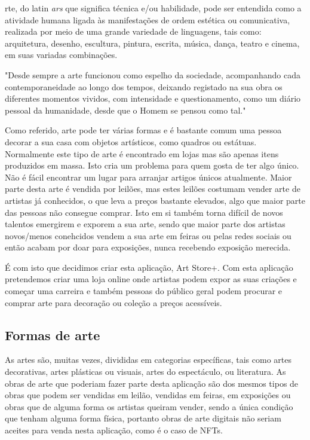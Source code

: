 \documentclass[conference]{IEEEtran}
\begin{document}
rte, do latin \textit{ars} que significa técnica e/ou 
habilidade, pode ser entendida como a atividade humana ligada às 
manifestações de ordem estética ou comunicativa, realizada 
por meio de uma grande variedade de linguagens, tais como: 
arquitetura, desenho, escultura, 
pintura, escrita, música, dança, teatro e cinema, em suas 
variadas combinações. \cite{wikiarte}

"Desde sempre a arte funcionou como espelho da sociedade, 
acompanhando cada contemporaneidade ao longo dos tempos, 
deixando registado na sua obra os diferentes 
momentos vividos, com intensidade e questionamento, como 
um diário pessoal da humanidade, 
desde que o Homem se pensou como tal." \cite{patrimonio}

Como referido, arte pode ter várias formas e é bastante comum 
uma pessoa decorar a sua casa com objetos artísticos, como 
quadros ou estátuas. Normalmente este tipo de arte é encontrado 
em lojas mas são apenas itens produzidos em massa. Isto cria um 
problema para quem gosta de ter algo único. Não é fácil encontrar 
um lugar para arranjar artigos únicos atualmente. Maior parte 
desta arte é vendida por leilões, mas estes leilões costumam 
vender arte de artistas já conhecidos, o que leva a preços 
bastante elevados, algo que maior parte das pessoas não consegue 
comprar. Isto em si também torna difícil de novos talentos emergirem 
e exporem a sua arte, sendo que maior parte dos artistas novos/menos 
conehcidos vendem a sua arte em feiras ou pelas redes sociais ou 
então acabam por doar para exposições, nunca recebendo exposição 
merecida.

É com isto que decidimos criar esta aplicação, Art Store+. Com 
esta aplicação pretendemos criar uma loja online onde artistas 
podem expor as suas criações e começar uma carreira e também 
pessoas do público geral podem procurar e comprar arte para 
decoração ou coleção a preços acessíveis.


\subsection{Formas de arte}
As artes são, muitas vezes, divididas em categorias específicas, 
tais como artes decorativas, 
artes plásticas ou visuais, artes do espectáculo, ou literatura.
As obras de arte que poderiam fazer parte desta aplicação 
são dos mesmos tipos de obras que podem ser vendidas em leilão, 
vendidas em feiras, em exposições ou obras que de alguma 
forma os artistas queiram vender, sendo a única condição que tenham 
alguma forma física, portanto obras de arte digitais não seriam 
aceites para venda nesta aplicação, como é o caso de NFTs.
\end{document}
